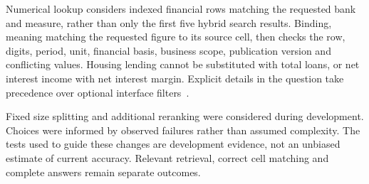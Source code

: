 Numerical lookup considers indexed financial rows matching the requested bank and measure, rather than only the first five hybrid search results. Binding, meaning matching the requested figure to its source cell, then checks the row, digits, period, unit, financial basis, business scope, publication version and conflicting values. Housing lending cannot be substituted with total loans, or net interest income with net interest margin. Explicit details in the question take precedence over optional interface filters~\cite{fintraceRuntime2026}.

Fixed size splitting and additional reranking were considered during development. Choices were informed by observed failures rather than assumed complexity. The tests used to guide these changes are development evidence, not an unbiased estimate of current accuracy. Relevant retrieval, correct cell matching and complete answers remain separate outcomes.
